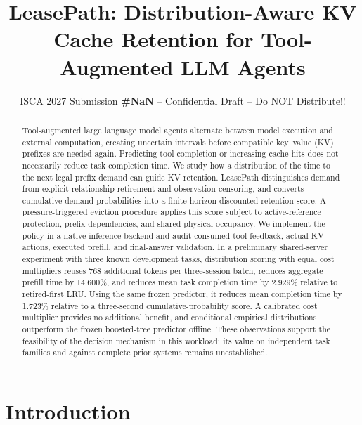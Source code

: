 \documentclass[sigconf, screen, review]{acmart}
\newcommand{\iscasubmissionnumber}{NaN}
\begin{document}
\title{LeasePath: Distribution-Aware KV Cache Retention for Tool-Augmented LLM Agents}
\author{ISCA 2027 Submission \textbf{\#\iscasubmissionnumber} -- Confidential Draft -- Do NOT Distribute!!}
\renewcommand{\shortauthors}{ISCA 2027 Submission \#\iscasubmissionnumber}

\begin{abstract}
Tool-augmented large language model agents alternate between model
execution and external computation, creating uncertain intervals before
compatible key--value (KV) prefixes are needed again. Predicting tool
completion or increasing cache hits does not necessarily reduce task
completion time. We study how a distribution of the time to the next
legal prefix demand can guide KV retention. LeasePath distinguishes
demand from explicit relationship retirement and observation censoring,
and converts cumulative demand probabilities into a finite-horizon
discounted retention score. A pressure-triggered eviction procedure
applies this score subject to active-reference protection, prefix
dependencies, and shared physical occupancy. We implement the policy in
a native inference backend and audit consumed tool feedback, actual KV
actions, executed prefill, and final-answer validation. In a preliminary
shared-server experiment with three known development tasks,
distribution scoring with equal cost multipliers reuses 768 additional
tokens per three-session batch, reduces aggregate prefill time by
14.600\%, and reduces mean task completion time by 2.929\% relative to
retired-first LRU. Using the same frozen predictor, it reduces mean
completion time by 1.723\% relative to a three-second
cumulative-probability score. A calibrated cost multiplier provides no
additional benefit, and conditional empirical distributions outperform
the frozen boosted-tree predictor offline. These observations support
the feasibility of the decision mechanism in this workload; its value on
independent task families and against complete prior systems remains
unestablished.
\end{abstract}
\maketitle

\section{Introduction}\label{introduction}
\end{document}
